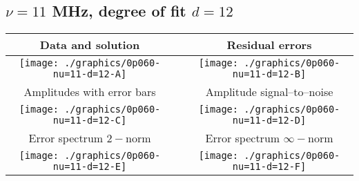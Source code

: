 

% 

\clearpage{}
\break{}

\subsection{$\nu = 11$ MHz, degree of fit $d = 12$}

\begin{table}[h]
    \begin{center}
        \begin{tabular}{ccc}
            Data and solution & \quad & Residual errors \\\hline
            \texttt{[image: ./graphics/0p060-nu=11-d=12-A]} &&
            \texttt{[image: ./graphics/0p060-nu=11-d=12-B]} \\[15pt]
            Amplitudes with error bars && Amplitude signal--to--noise \\\hline
            \texttt{[image: ./graphics/0p060-nu=11-d=12-C]} &&
            \texttt{[image: ./graphics/0p060-nu=11-d=12-D]} \\[15pt]
            Error spectrum $2-$norm && Error spectrum $\infty-$norm \\\hline
            \texttt{[image: ./graphics/0p060-nu=11-d=12-E]} &&
            \texttt{[image: ./graphics/0p060-nu=11-d=12-F]} \\[15pt]
        \end{tabular}
    \end{center}
\label{fig:elev=60, nu=11}
\end{table}



\endinput
